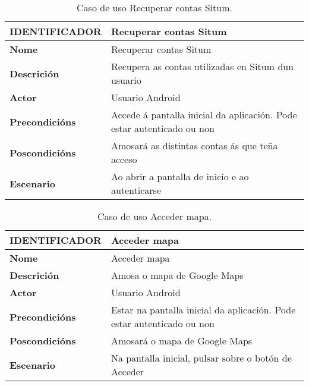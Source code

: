 \begin{table} [tbh]
	\footnotesize
	\centering
	\begin{tabular}{|l|p{10cm}|}
		\hline 
		\textbf{IDENTIFICADOR}	& \textbf{Recuperar contas Situm} \\ 
		\hline 
		\textbf{Nome} & Recuperar contas Situm \\ 
		\hline 
		\textbf{Descrición} & Recupera as contas utilizadas en Situm dun usuario \\ 
		\hline 
		\textbf{Actor} & Usuario Android \\ 
		\hline 
		\textbf{Precondicións} & Accede á pantalla inicial da aplicación. Pode estar autenticado ou non \\ 
		\hline 
		\textbf{Poscondicións} & Amosará as distintas contas ás que teña acceso \\ 
		\hline 
		\textbf{Escenario} & Ao abrir a pantalla de inicio e ao autenticarse \\ 
		\hline 
	\end{tabular}
	\caption{Caso de uso Recuperar contas Situm.}
	\label{tab:cuRecuperarContasSitum}
\end{table}

\begin{table} [tbh]
	\footnotesize
	\centering
	\begin{tabular}{|l|p{10cm}|}
		\hline 
		\textbf{IDENTIFICADOR}	& \textbf{Acceder mapa} \\ 
		\hline 
		\textbf{Nome} & Acceder mapa \\ 
		\hline 
		\textbf{Descrición} & Amosa o mapa de Google Maps \\ 
		\hline 
		\textbf{Actor} & Usuario Android \\ 
		\hline 
		\textbf{Precondicións} & Estar na pantalla inicial da aplicación. Pode estar autenticado ou non \\ 
		\hline 
		\textbf{Poscondicións} & Amosará o mapa de Google Maps \\ 
		\hline 
		\textbf{Escenario} & Na pantalla inicial, pulsar sobre o botón de Acceder \\ 
		\hline 
	\end{tabular}
	\caption{Caso de uso Acceder mapa.}
	\label{tab:cuAccederMapa}
\end{table}

